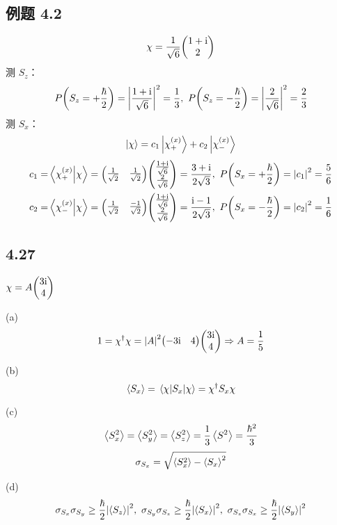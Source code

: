 \subsection{例题 4.2}
\begin{framed}
    \[
    \chi = \frac{1}{\sqrt{6}} \mqty(1 + \rmi \\ 2)
    \] 测 $S_z$：\[
    P\qty(S_z = + \frac{\hbar}{2}) = \qty|\frac{1 + \mathrm{i}}{\sqrt{6}}|^2 = \frac{1}{3},\ P\qty(S_z = - \frac{\hbar}{2}) = \qty|\frac{2}{\sqrt{6}}|^2 = \frac{2}{3}
    \] 测 $S_x$：\[
    \ket{\chi} = c_1 \ket{\chi_+^{(x)}} + c_2 \ket{\chi_-^{(x)}}
    \] \begin{align*}
        c_1 = & \braket{\chi_+^{(x)}}{\chi} = \mqty(\frac{1}{\sqrt{2}} & \frac{1}{\sqrt{2}}) \mqty(\frac{1 + \rmi}{\sqrt{6}} \\ \frac{2}{\sqrt{6}}) = \frac{3 + \rmi}{2 \sqrt{3}},\ P\qty(S_x = + \frac{\hbar}{2}) = \qty|c_1|^2 = \frac{5}{6}\\
        c_2 = & \braket{\chi_-^{(x)}}{\chi} = \mqty(\frac{1}{\sqrt{2}} & \frac{- 1}{\sqrt{2}}) \mqty(\frac{1 + \rmi}{\sqrt{6}} \\ \frac{2}{\sqrt{6}}) = \frac{\rmi - 1}{2 \sqrt{3}},\ P\qty(S_x = - \frac{\hbar}{2}) = \qty|c_2|^2 = \frac{1}{6}
    \end{align*}
\end{framed}

\subsection{4.27}
\begin{framed}
    $\chi = A \mqty(3 \rmi \\ 4)$

    (a)
    \[
    1 = \chi^{\dagger} \chi = \qty|A|^2 \mqty(- 3 \rmi & 4) \mqty(3 \rmi \\ 4) \Rightarrow A = \frac{1}{5}
    \]

    (b)
    \[
    \expval{S_x} = \ev{S_x}{\chi} = \chi^{\dagger} S_x \chi
    \]

    (c)
    \[
    \expval{S_x^2} = \expval{S_y^2} = \expval{S_z^2} = \frac{1}{3} \expval{S^2} = \frac{\hbar^2}{3}
    \] \[
    \sigma_{S_x} = \sqrt{\expval{S_x^2} - \expval{S_x}^2}
    \]

    (d)
    \[
    \sigma_{S_x} \sigma_{S_y} \geq \frac{\hbar}{2} \qty|\expval{S_z}|^2,\ \sigma_{S_y} \sigma_{S_z} \geq \frac{\hbar}{2} \qty|\expval{S_x}|^2,\ \sigma_{S_z} \sigma_{S_x} \geq \frac{\hbar}{2} \qty|\expval{S_y}|^2
    \]
\end{framed}

